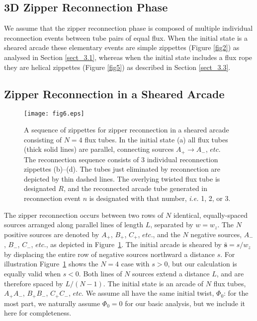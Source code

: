 \documentclass[10pt,namedreferneces]{SolarPhysics}
\begin{document}
\begin{article}
\section{3D Zipper  Reconnection Phase}
\label{sect_4}

We assume that the zipper reconnection phase is composed of multiple individual reconnection events between tube pairs of equal flux.  When the initial state is a sheared arcade these elementary events are simple zippettes (Figure \ref{fig2}) as analysed in Section \ref{sect_3.1}, whereas when the initial state includes a flux rope they are helical zippettes (Figure \ref{fig5}) as described in Section \ref{sect_3.3}.  

\subsection{\bf Zipper Reconnection in a Sheared Arcade}
\label{sect_4.1}

\begin{figure}[h]
{\centering
 \texttt{[image: fig6.eps]}
\caption{A sequence of zippettes for zipper reconnection in a sheared arcade consisting of   $N=4$ flux tubes.  In the initial state (a) all flux tubes (thick solid lines) are parallel, connecting sources $A_+\to A_-$, $etc$.  The reconnection sequence consists of 3 individual reconnection zippettes (b)--(d).  The tubes just eliminated by reconnection are depicted by thin dashed lines.  The overlying twisted flux tube is designated $R$, and the reconnected arcade tube generated in reconnection event $n$ is designated with that number, \textit{i.e.} 1, 2, or 3.}
\label{fig6}}
\end{figure}

The zipper reconnection occurs between two rows of $N$ identical, equally-spaced sources arranged along parallel lines of length $L$, separated by $w=w_z$.  The $N$ positive sources are denoted by $A_+$, $B_+$, $C_+$, $etc.$, and the $N$ negative sources, $A_-$, $B_-$, $C_-$, $etc.$, as depicted in Figure\ \ref{fig6}.   The initial arcade is sheared by $\bm\bar{s}=s/w_z$ by displacing the entire row of negative sources northward a distance $s$.  For illustration Figure\ \ref{fig6} shows the $N=4$ case with $s>0$, but our calculation is equally valid when $s<0$.    Both lines of $N$ sources extend a distance $L$, and are therefore spaced by $L/(N-1)$.  The initial state is an arcade of $N$  flux tubes, $A_+A_-$, $B_+B_-$, $C_+C_-$, $etc$.  We assume  all have the same initial twist, $\Phi_0$: for the most part, we naturally assume $\Phi_0=0$ for our basic analysis, but we include it here for completeness.


\end{article}
\end{document}
